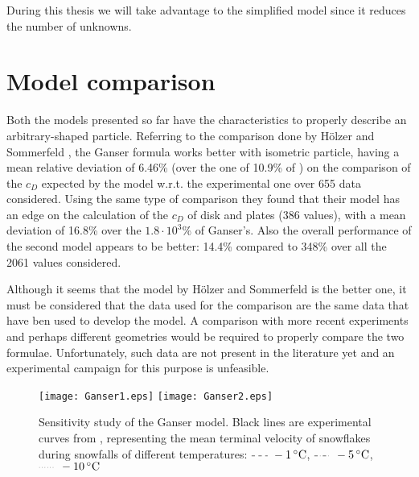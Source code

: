 		During this thesis we will take advantage to the simplified model since it reduces the number of unknowns.
		

	\section{Model comparison}
		Both the models presented so far have the characteristics to properly describe an arbitrary-shaped particle. Referring to the comparison done by H\"{o}lzer and Sommerfeld \cite{HoltzerSommerfeld-2008}, the Ganser formula works better with isometric particle, having a mean relative deviation of 6.46\% (over the one of 10.9\% of ) on the comparison of the $ c_D $ expected by the model w.r.t. the experimental one over 655 data considered. Using the same type of comparison they found that their model has an edge on the calculation of the $ c_D $ of disk and plates (386 values), with a mean deviation of 16.8\% over the $ 1.8 \cdot 10^3 \% $ of Ganser's. Also the overall performance of the second model appears to be better: 14.4\% compared to 348\% over all the 2061 values considered. 
		
		Although it seems that the model by H\"{o}lzer and Sommerfeld is the better one, it must be considered that the data used for the comparison are the same data that have ben used to develop the model. A comparison with more recent experiments and perhaps different geometries would be required to properly compare the two formulae. Unfortunately, such data are not present in the literature yet and an experimental campaign for this purpose is unfeasible. 
		
		\begin{figure}
			\centering
			\texttt{[image: Ganser1.eps]}
			\texttt{[image: Ganser2.eps]}
			\caption[Sensitivity study of the Ganser model.]{Sensitivity study of the Ganser model. Black lines are experimental curves from \cite{BrandesIkedEtAl-2008}, representing the mean terminal velocity of snowflakes during snowfalls of different temperatures: 
				$ \tikz[baseline] {\draw[dashed] (0,.5ex)--(.5,.5ex) ;} ~\SI{-1}{\celsius} $,
				$ \tikz[baseline] {\draw[dash dot] (0,.5ex)--(.5,.5ex) ;} ~\SI{-5}{\celsius} $,
				$ \tikz[baseline] {\draw[dotted] (0,.5ex)--(.5,.5ex) ;} ~\SI{-10}{\celsius} $}
			\label{fig: sensitivityGanser}
		\end{figure}	
		
